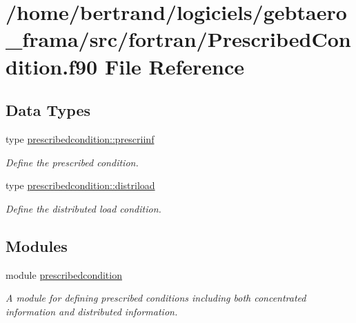 \hypertarget{_prescribed_condition_8f90}{}\section{/home/bertrand/logiciels/gebtaero\+\_\+frama/src/fortran/\+Prescribed\+Condition.f90 File Reference}
\label{_prescribed_condition_8f90}
\subsection*{Data Types}
\begin{DoxyCompactItemize}
\item 
type \hyperlink{structprescribedcondition_1_1prescriinf}{prescribedcondition\+::prescriinf}
\begin{DoxyCompactList}\small\item\em Define the prescribed condition. \end{DoxyCompactList}\item 
type \hyperlink{structprescribedcondition_1_1distriload}{prescribedcondition\+::distriload}
\begin{DoxyCompactList}\small\item\em Define the distributed load condition. \end{DoxyCompactList}\end{DoxyCompactItemize}
\subsection*{Modules}
\begin{DoxyCompactItemize}
\item 
module \hyperlink{namespaceprescribedcondition}{prescribedcondition}
\begin{DoxyCompactList}\small\item\em A module for defining prescribed conditions including both concentrated information and distributed information. \end{DoxyCompactList}\end{DoxyCompactItemize}
